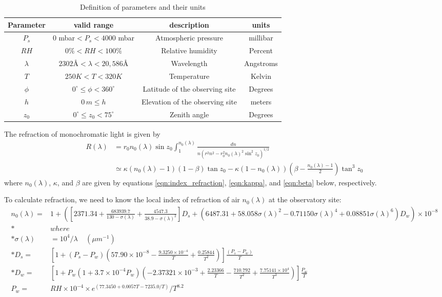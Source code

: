 \documentclass[]{article}
\begin{document}
\begin{table}[h!]
	\begin{center}
	\begin{tabular}{c | c | c | c}
		Parameter & valid range & description & units \\
		\hline
		$P_s$& $0$ mbar$ < P_s < 4000$ mbar & Atmospheric pressure & millibar  \\
		$RH$ & $0\% < RH < 100\%$ & Relative humidity & Percent \\
		$\lambda$& $2302$\AA{}$ < \lambda < 20,586 $\AA{} & Wavelength  & Angstroms \\
		$T$& $250K < T < 320K$ & Temperature & Kelvin \\
		$\phi$ & $0^\circ \leq \phi < 360^\circ$ & Latitude of the observing site & Degrees \\
		$h$ & $0\,m\leq h$ & Elevation of the observing site & meters \\
		$z_0$ & $0^\circ\leq z_0 < 75^\circ$ & Zenith angle & Degrees
	\end{tabular}
	\end{center}
	\caption{Definition of parameters and their units}
\end{table}

The refraction of monochromatic light is given by
\begin{align}
R(\lambda) &= r_0 n_0(\lambda) \sin z_0 \int_1^{n_0(\lambda)} \frac{dn}{n \left(r^2n^2 -r_0^2n_0(\lambda)^2\sin^2z_0\right)^{1/2}} \nonumber\\
&\simeq \kappa (n_0(\lambda) - 1) (1 - \beta) \tan z_0 - \kappa (1 - n_0(\lambda)) \left(\beta - \frac{n_0(\lambda) - 1}{2}\right) \tan^3z_0
\end{align}
where $n_0(\lambda)$, $\kappa$, and $\beta$ are given by equations \ref{eqn:index_refraction}, \ref{eqn:kappa}, and \ref{eqn:beta} below, respectively.

To calculate refraction, we need to know the local index of refraction of air $n_0(\lambda)$ at the observatory site:
\begin{align}
	n_0(\lambda) =&1 + \left(\left[2371.34 +\frac{683939.7}{130 - \sigma(\lambda)} +\frac{4547.3}{38.9 - \sigma(\lambda)^2}\right] D_s 
		+ \left(6487.31 + 58.058 \sigma(\lambda)^2 - 0.71150 \sigma(\lambda)^4 +0.08851 \sigma(\lambda)^6\right) D_w \right)\times 10^{-8} \label{eqn:index_refraction}\\*
	& where \nonumber\\*
	\sigma(\lambda) &= 10^4 /\lambda \;\;\;\;\left(\mu m^{-1}\right)\nonumber \\*
	D_s =& \left[1 + (P_s-P_w) \left(57.90\times10^{-8} - \frac{9.3250\times10^{-4}}{T}+\frac{0.25844}{T^2}\right)\right] \frac{(P_s-P_w)}{T} \nonumber \\*
	D_w =& \left[1 + P_w \left(1 + 3.7\times10^{-4} P_w\right)\left(-2.37321\times10^{-3} + \frac{2.23366}{T} - \frac{710.792}{T^2} + \frac{7.75141\times10^4}{T^3}\right)\right] \frac{P_w}{T} \nonumber \\
	P_w =& RH\times 10^{-4} \times e^{(77.3450 + 0.0057 T - 7235.0/T)}/T^{8.2} \nonumber
\end{align}
\end{document}
